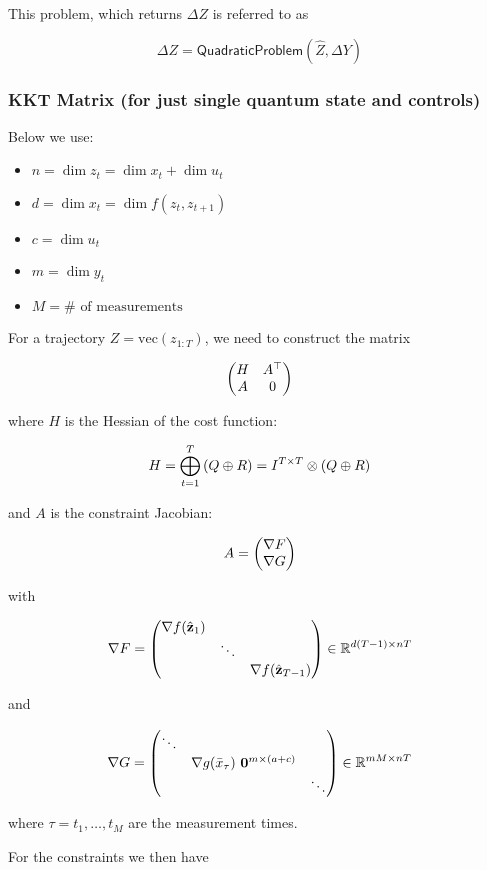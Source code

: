 \documentclass{article}
\begin{document}
This problem, which returns $\Delta Z$ is referred to as 

$$
\boxed{
\Delta Z = \textsf{QuadraticProblem}(\hat Z, \Delta Y)
}
$$

\newpage
\subsubsection*{KKT Matrix (for just single quantum state and controls)}

Below we use:

\begin{itemize}
  \item $n = \dim z_t = \dim x_t + \dim u_t $ 
  \item $d = \dim x_t = \dim f(z_t, z_{t+1}) $ 
  \item $c = \dim u_t$  
  \item $m = \dim y_t$ 
  \item $M = \#\text{ of measurements}$
\end{itemize}



For a trajectory $Z = \text{vec}(z_{1:T})$, we need to construct the matrix

$$
\mqty(
  H & A^\top \\
  A & 0
)
$$


where $H$ is the Hessian of the cost function:

$$
H = \bigoplus_{t=1}^T \qty(Q \oplus R) = I^{T \times T} \otimes \qty(Q \oplus R)
$$


and $A$ is the constraint Jacobian:

$$
A = \mqty(
  \nabla F \\
  \nabla G
)
$$

with 

$$
\nabla F = \mqty(
  \nabla f(\hat{\vb{z}}_1) \\
  & \ddots \\
  & & \nabla f(\hat{\vb{z}}_{T-1})
) \in \mathbb{R}^{d (T - 1) \times n T}
$$

and

$$
\nabla G = \mqty(
  \ddots \\
  & \nabla g(\bar x_{\tau}) \ \vb{0}^{m \times (a + c)} \\
  & & \ddots
) \in \mathbb{R}^{m M \times n T}
$$

where $\tau = t_1, \dots, t_M$ are the measurement times.

\hfill

For the constraints we then have
\end{document}
